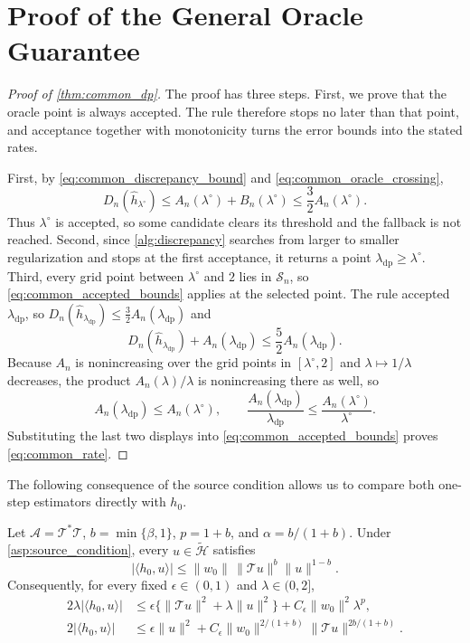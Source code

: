 \section{Proof of the General Oracle Guarantee}\label{sec:proof_common_dp}

\begin{proof}[Proof of \cref{thm:common_dp}]
The proof has three steps. First, we prove that the oracle point is always accepted.  The rule therefore stops no later than that point, and acceptance together with monotonicity turns the error bounds into the stated rates.

First, by \eqref{eq:common_discrepancy_bound} and
\eqref{eq:common_oracle_crossing},
\[
D_n(\hat h_{\lambda^\circ})
\leqslant A_n(\lambda^\circ)
+B_n(\lambda^\circ)
\leqslant\frac32 A_n(\lambda^\circ).
\]
Thus $\lambda^\circ$ is accepted, so some candidate clears its threshold and the fallback is not reached. Second, since \cref{alg:discrepancy} searches from larger to smaller regularization and stops at the first acceptance, it returns a point
$\lambda_{\mathrm{dp}}\geqslant\lambda^\circ$.
Third, every grid point between $\lambda^\circ$ and $2$ lies in $\mathcal S_n$, so
\eqref{eq:common_accepted_bounds} applies at the selected point. The rule accepted
$\lambda_{\mathrm{dp}}$, so $D_n(\hat h_{\lambda_{\mathrm{dp}}})\leqslant\tfrac32A_n(\lambda_{\mathrm{dp}})$ and
\[
D_n(\hat h_{\lambda_{\mathrm{dp}}})+A_n(\lambda_{\mathrm{dp}})
\leqslant\frac52 A_n(\lambda_{\mathrm{dp}}).
\]
Because $A_n$ is nonincreasing over the grid points in $[\lambda^\circ,2]$ and $\lambda\mapsto1/\lambda$ decreases, the product $A_n(\lambda)/\lambda$ is nonincreasing there as well, so
\[
A_n(\lambda_{\mathrm{dp}})
\leqslant A_n(\lambda^\circ),
\qquad
\frac{A_n(\lambda_{\mathrm{dp}})}{\lambda_{\mathrm{dp}}}
\leqslant\frac{A_n(\lambda^\circ)}{\lambda^\circ}.
\]
Substituting the last two displays into \eqref{eq:common_accepted_bounds} proves
\eqref{eq:common_rate}.
\end{proof}

The following consequence of the source condition allows us to compare
both one-step estimators directly with $h_0$.

\begin{lemma}\label{lemma:variational_source}
Let $\mathcal A=\mathcal T^*\mathcal T$,
$b=\min\{\beta,1\}$, $p=1+b$, and $\alpha=b/(1+b)$. Under
\cref{asp:source_condition}, every $u\in\widetilde{\mathcal H}$ satisfies
\[
|\langle h_0,u\rangle|
\leqslant \|w_0\|\,\|\mathcal Tu\|^b\|u\|^{1-b}.
\]
Consequently, for every fixed $\epsilon\in(0,1)$ and
$\lambda\in(0,2]$,
\begin{align*}
2\lambda|\langle h_0,u\rangle|
&\leqslant
\epsilon\{\|\mathcal Tu\|^2+\lambda\|u\|^2\}
+C_\epsilon\|w_0\|^2\lambda^p,\\
2|\langle h_0,u\rangle|
&\leqslant
\epsilon\|u\|^2
+C_\epsilon\|w_0\|^{2/(1+b)}
\|\mathcal Tu\|^{2b/(1+b)}.
\end{align*}
\end{lemma}

